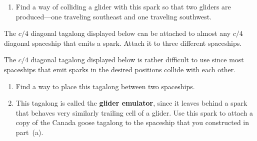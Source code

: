 \begin{multicols}{2}
\begin{problemstar}
\begin{enumerate}[label=\bf\color{ocre}(\alph*)]
			\item Find a way of colliding a glider with this spark so that two gliders are produced---one traveling southeast and one traveling southwest.
		\end{enumerate}
	\end{problemstar}
	
	
	\mfilbreak
	
	
	\begin{problem}\label{exer:c4_diagonal_tagalong} 
		The $c/4$ diagonal tagalong displayed below can be attached to almost any $c/4$ diagonal spaceship that emits a spark. Attach it to three different spaceships.
		
		\begin{center}
		\end{center}
	\end{problem}
	
	
	\mfilbreak
	
	
	\begin{problem}\label{exer:c4_diagonal_glider_emulator} 
		The $c/4$ diagonal tagalong displayed below is rather difficult to use since most spaceships that emit sparks in the desired positions collide with each other.
		
		\begin{center}
		\end{center}
		
		\begin{enumerate}[label=\bf\color{ocre}(\alph*)]
			\item Find a way to place this tagalong between two spaceships.
			
			\item This tagalong is called the \textbf{glider emulator}, since it leaves behind a spark that behaves very similarly trailing cell of a glider. Use this spark to attach a copy of the Canada goose tagalong to the spaceship that you constructed in part~(a).
		\end{enumerate}
	\end{problem}
	

\end{multicols}
